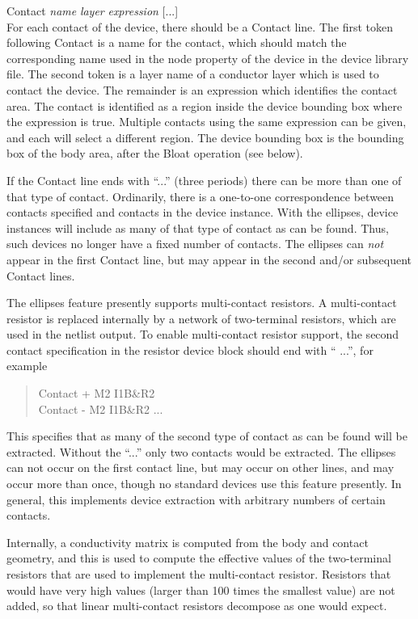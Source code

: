 \begin{description}
\item{\et Contact} {\it name} {\it layer} {\it expression} [{\vt ...}]\\
For each contact of the device, there should be a {\et Contact} line. 
The first token following {\et Contact} is a name for the contact,
which should match the corresponding name used in the node property of
the device in the device library file.  The second token is a layer
name of a conductor layer which is used to contact the device.  The
remainder is an expression which identifies the contact area.  The
contact is identified as a region inside the device bounding box where
the expression is true.  Multiple contacts using the same expression
can be given, and each will select a different region.  The device
bounding box is the bounding box of the body area, after the {\et
Bloat} operation (see below).

If the {\et Contact} line ends with ``{\vt ...}'' (three periods)
there can be more than one of that type of contact.  Ordinarily, there
is a one-to-one correspondence between contacts specified and contacts
in the device instance.  With the ellipses, device instances will
include as many of that type of contact as can be found.  Thus, such
devices no longer have a fixed number of contacts.  The ellipses can
{\it not} appear in the first {\et Contact} line, but may appear in
the second and/or subsequent {\et Contact} lines.

The ellipses feature presently supports multi-contact resistors.  A
multi-contact resistor is replaced internally by a network of
two-terminal resistors, which are used in the netlist output.  To
enable multi-contact resistor support, the second contact
specification in the resistor device block should end with ``{\vt
...}'', for example
\begin{quote}\vt
Contact + M2 I1B\&R2\\
Contact - M2 I1B\&R2 ...
\end{quote}

This specifies that as many of the second type of contact as can be
found will be extracted.  Without the ``{\vt ...}'' only two contacts
would be extracted.  The ellipses can not occur on the first contact
line, but may occur on other lines, and may occur more than once,
though no standard devices use this feature presently.  In general,
this implements device extraction with arbitrary numbers of certain
contacts.

Internally, a conductivity matrix is computed from the body and
contact geometry, and this is used to compute the effective values of
the two-terminal resistors that are used to implement the
multi-contact resistor.  Resistors that would have very high values
(larger than 100 times the smallest value) are not added, so that
linear multi-contact resistors decompose as one would expect.


\end{description}
